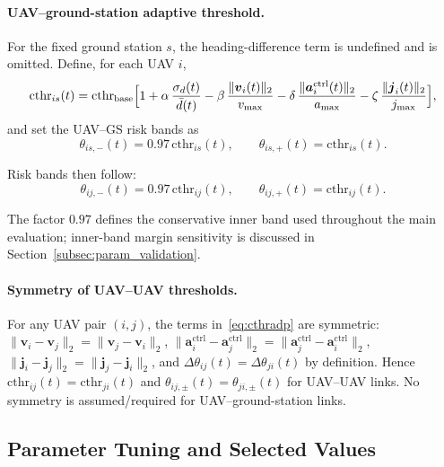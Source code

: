 \documentclass[preprint,12pt]{elsarticle}
\theoremstyle{definition}\newtheorem{definition}{Definition}
\theoremstyle{plain}\newtheorem{theorem}{Theorem}
\theoremstyle{plain}\newtheorem{lemma}{Lemma}
\theoremstyle{plain}\newtheorem{corollary}{Corollary}
\theoremstyle{plain}\newtheorem{assumption}{Assumption}
\theoremstyle{remark}\newtheorem{remark}[theorem]{Remark}
\begin{document}
\paragraph{UAV--ground-station adaptive threshold.}
For the fixed ground station $s$, the heading-difference term is undefined and is omitted.
Define, for each UAV $i$,
\begin{equation}
 \mathrm{cthr}_{is}(t)
  =\mathrm{cthr}_{\text{base}}
   \Bigl[
     1 
     + \alpha\,\frac{\sigma_d(t)}{\bar d(t)}
     - \beta\,\frac{\|\boldsymbol v_i(t)\|_2}{v_{\max}}
     - \delta\,\frac{\|\boldsymbol a^{\text{ctrl}}_i(t)\|_2}{a_{\max}}
     - \zeta\,\frac{\|\boldsymbol j_i(t)\|_2}{j_{\max}}
   \Bigr],
  \label{eq:cthradp_gs}
\end{equation}
and set the UAV--GS risk bands as
\[
  \theta_{is,-}(t)=0.97\,\mathrm{cthr}_{is}(t),\qquad
  \theta_{is,+}(t)=\mathrm{cthr}_{is}(t).
\]

Risk bands then follow:
\begin{equation}
  \theta_{ij,-}(t)=0.97\,\mathrm{cthr}_{ij}(t),\qquad
  \theta_{ij,+}(t)=\mathrm{cthr}_{ij}(t).
  \label{eq:risk_bands}
\end{equation}

The factor \(0.97\) defines the conservative inner band used throughout the main evaluation; inner-band margin sensitivity is discussed in Section~\ref{subsec:param_validation}.

\paragraph{Symmetry of UAV--UAV thresholds.}
For any UAV pair $(i,j)$, the terms in~\eqref{eq:cthradp} are symmetric:
$\|\boldsymbol v_i-\boldsymbol v_j\|_2=\|\boldsymbol v_j-\boldsymbol v_i\|_2$,
$\|\boldsymbol a_i^{\text{ctrl}}-\boldsymbol a_j^{\text{ctrl}}\|_2=\|\boldsymbol a_j^{\text{ctrl}}-\boldsymbol a_i^{\text{ctrl}}\|_2$,
$\|\boldsymbol j_i-\boldsymbol j_j\|_2=\|\boldsymbol j_j-\boldsymbol j_i\|_2$,
and $\Delta\theta_{ij}(t)=\Delta\theta_{ji}(t)$ by definition.
Hence $\mathrm{cthr}_{ij}(t)=\mathrm{cthr}_{ji}(t)$ and $\theta_{ij,\pm}(t)=\theta_{ji,\pm}(t)$ for UAV--UAV links.
No symmetry is assumed/required for UAV--ground-station links.


\subsection{Parameter Tuning and Selected Values}
\label{subsec:parameter_values}
\end{document}

